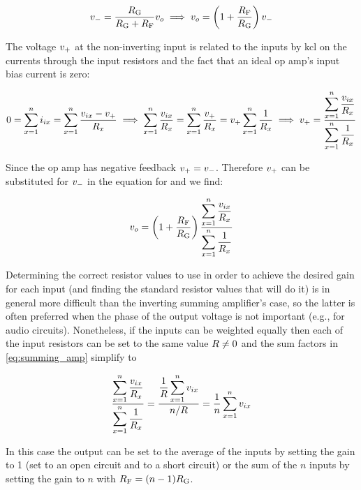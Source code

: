 \begin{equation*}
v\sub{-} = \frac{\R[G]}{\R[G] + \R[F]}\vout \implies \vout = \left(1 + \frac{\R[F]}{\R[G]}\right)v\sub{-}
\end{equation*}

The voltage \(v_\mathrm{+}\) at the non-inverting input is related to the inputs by \ac{kcl} on the currents through the input resistors and the fact that an ideal op amp's input bias current is zero:

\begin{equation*}
	0 = \sum_{x=1}^{n}\iin[x] = \sum_{x=1}^{n}\frac{\vin[x] - v\sub{+}}{R_x} \implies \sum_{x=1}^{n}\frac{\vin[x]}{R_x} = \sum_{x=1}^{n}\frac{v\sub{+}}{R_x} = v\sub{+}\sum_{x=1}^{n}\frac{1}{R_x} \implies v\sub{+} = \frac{\displaystyle\sum_{x=1}^{n}\frac{\vin[x]}{R_x}}{\displaystyle\sum_{x=1}^{n}\frac{1}{R_x}}
\end{equation*}

Since the op amp has negative feedback \(v_\mathrm{+} = v_\mathrm{-}\).
Therefore \(v_\mathrm{+}\) can be substituted for \(v_\mathrm{-}\) in the equation for \vout and we find:

\begin{equation}
	\vout = \left(1 + \frac{\R[F]}{\R[G]}\right)\frac{\displaystyle\sum_{x=1}^{n}\frac{\vin[x]}{R_x}}{\displaystyle\sum_{x=1}^{n}\frac{1}{R_x}}
	\label{eq:summing_amp}
\end{equation}

Determining the correct resistor values to use in order to achieve the desired gain for each input (and finding the standard resistor values that will do it) is in general more difficult than the inverting summing amplifier's case, so the latter is often preferred when the phase of the output voltage is not important (e.g., for audio circuits).
Nonetheless, if the inputs can be weighted equally then each of the input resistors can be set to the same value \(\R \neq 0\) and the sum factors in \eqref{eq:summing_amp} simplify to

\begin{equation*}
	\frac{\displaystyle\sum_{x=1}^{n}\frac{\vin[x]}{R_x}}{\displaystyle\sum_{x=1}^{n}\frac{1}{R_x}} = \frac{\displaystyle\frac{1}{R}\sum_{x=1}^{n}\vin[x]}{n/R} = \frac{1}{n}\sum_{x=1}^{n}\vin[x]
\end{equation*}

In this case the output can be set to the average of the inputs by setting the gain to 1 (set \R[G] to an open circuit and \R[F] to a short circuit) or the sum of the \(n\) inputs by setting the gain to \(n\) with \(\R[F] = (n - 1)\R[G]\).

